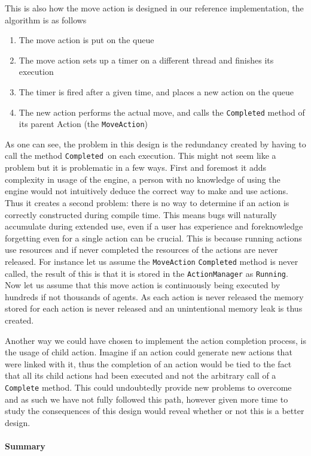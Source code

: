 This is also how the move action is designed in our reference implementation,
the algorithm is as follows
\begin{enumerate}
\item The move action is put on the queue 
\item The move action sets up a timer on a different thread and finishes
its execution
\item The timer is fired after a given time, and places a new action on
the queue
\item The new action performs the actual move, and calls the \texttt{Completed}
method of its parent Action (the \texttt{MoveAction})
\end{enumerate}
As one can see, the problem in this design is the redundancy created
by having to call the method \texttt{Completed }on each execution.
This might not seem like a problem but it is problematic in a few
ways. First and foremost it adds complexity in usage of the engine,
a person with no knowledge of using the engine would not intuitively
deduce the correct way to make and use actions. Thus it creates a
second problem: there is no way to determine if an action is correctly
constructed during compile time. This means bugs will naturally accumulate
during extended use, even if a user has experience and foreknowledge
forgetting even for a single action can be crucial. This is because
running actions use resources and if never completed the resources
of the actions are never released. For instance let us assume the
\texttt{MoveAction} \texttt{Completed} method is never called, the
result of this is that it is stored in the \texttt{ActionManager}
as \texttt{Running}. Now let us assume that this move action is continuously
being executed by hundreds if not thousands of agents. As each action
is never released the memory stored for each action is never released
and an unintentional memory leak is thus created.

Another way we could have chosen to implement the action completion
process, is the usage of child action. Imagine if an action could
generate new actions that were linked with it, thus the completion
of an action would be tied to the fact that all its child actions
had been executed and not the arbitrary call of a \texttt{Complete}
method. This could undoubtedly provide new problems to overcome and
as such we have not fully followed this path, however given more time
to study the consequences of this design would reveal whether or not
this is a better design. 


\paragraph*{Summary}

